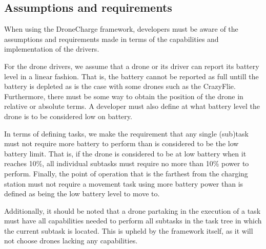 \subsection{Assumptions and requirements}
When using the DroneCharge framework, developers must be aware of the assumptions and requirements made in terms of the capabilities and implementation of the drivers.

For the drone drivers, we assume that a drone or its driver can report its battery level in a linear fashion. That is, the battery cannot be reported as full untill the battery is depleted as is the case with some drones such as the CrazyFlie. Furthermore, there must be some way to obtain the position of the drone in relative or absolute terms. A developer must also define at what battery level the drone is to be considered low on battery.

In terms of defining tasks, we make the requirement that any single (sub)task must not require more battery to perform than is considered to be the low battery limit. That is, if the drone is considered to be at low battery when it reaches 10\%, all individual subtasks must require no more than 10\% power to perform. Finally, the point of operation that is the farthest from the charging station must not require a movement task using more battery power than is defined as being the low battery level to move to.

Additionally, it should be noted that a drone partaking in the execution of a task must have all capabilities  needed to perform all subtasks in the task tree in which the current subtask is located. This is upheld by the framework itself, as it will not choose drones lacking any capabilities.
